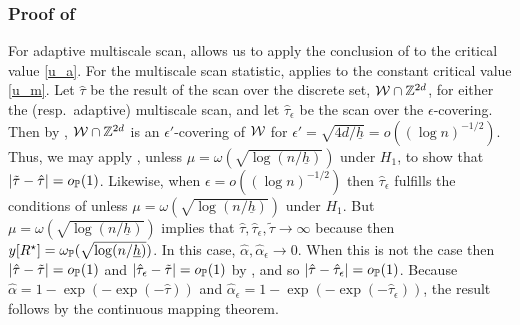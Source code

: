 \documentclass[twoside,11pt]{article}
\begin{document}
\subsubsection{Proof of }
For adaptive multiscale scan,  allows us to apply the conclusion of  to the critical value \eqref{u_a}. For the multiscale scan statistic,  applies to the constant critical value \eqref{u_m}.
Let $\hat \tau$ be the result of the scan over the discrete set, $\mathcal{W} \cap \mathbb{Z}^{2d}$, for either the (resp.~adaptive) multiscale scan, and let $\hat \tau_\epsilon$ be the scan over the $\epsilon$-covering.
Then by , $\mathcal{W} \cap \mathbb{Z}^{2d}$ is an $\epsilon'$-covering of $\mathcal{W}$ for $\epsilon' = \sqrt{4d / \underline h} = o((\log n)^{-1/2})$.
Thus, we may apply , unless $\mu = \omega(\sqrt{\log (n / \underline h)})$ under $H_1$, to show that $|\tilde \tau - \hat \tau| = o_{\mathbb{P}}(1)$.
Likewise, when $\epsilon = o((\log n)^{-1/2})$ then $\hat \tau_\epsilon$ fulfills the conditions of  unless $\mu = \omega(\sqrt{\log (n / \underline h)})$ under $H_1$.
But $\mu = \omega(\sqrt{\log (n / \underline h)})$ implies that $\hat \tau, \hat \tau_\epsilon, \tilde \tau \rightarrow \infty$ because then $y[R^\star] = \omega_{\mathbb{P}}(\sqrt{\log (n / \underline h)})$.
In this case, $\hat \alpha, \hat \alpha_\epsilon \rightarrow 0$.
When this is not the case then $|\hat \tau - \tilde \tau| = o_{\mathbb{P}}(1)$ and $|\hat \tau_\epsilon - \tilde \tau| = o_{\mathbb{P}}(1)$ by , and so $|\hat \tau - \hat \tau_\epsilon| = o_{\mathbb{P}}(1)$.
Because $\hat \alpha = 1 - \exp(-\exp(-\hat \tau))$ and $\hat \alpha_\epsilon = 1 - \exp(-\exp(-\hat \tau_\epsilon))$, the result follows by the continuous mapping theorem.
\end{document}
